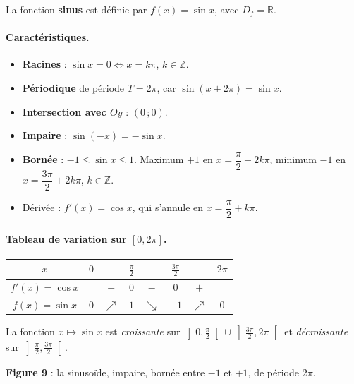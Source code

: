 \documentclass[11pt,a4paper]{article}
\newcommand{\R}{\mathbb{R}}
\newcommand{\Z}{\mathbb{Z}}
\newcommand{\Df}{D_f}
\newcommand{\croit}{\textcolor{varcol}{\Large$\nearrow$}}
\newcommand{\decroit}{\textcolor{varcol}{\Large$\searrow$}}
\begin{document}
\begin{definition}
La fonction \textbf{sinus} est définie par $f(x)=\sin x$, avec $\Df=\R$.
\end{definition}

\paragraph{Caractéristiques.}
\begin{itemize}[leftmargin=1.5em,topsep=2pt,itemsep=2pt]
  \item \textbf{Racines} : $\sin x=0 \Leftrightarrow x=k\pi$, $k\in\Z$.
  \item \textbf{Périodique} de période $T=2\pi$, car $\sin(x+2\pi)=\sin x$.
  \item \textbf{Intersection avec $Oy$} : $(0\,;0)$.
  \item \textbf{Impaire} : $\sin(-x)=-\sin x$.
  \item \textbf{Bornée} : $-1\leq \sin x\leq 1$. Maximum $+1$ en $x=\dfrac{\pi}{2}+2k\pi$,
        minimum $-1$ en $x=\dfrac{3\pi}{2}+2k\pi$, $k\in\Z$.
  \item Dérivée : $f'(x)=\cos x$, qui s'annule en $x=\dfrac{\pi}{2}+k\pi$.
\end{itemize}

\paragraph{Tableau de variation sur $[0,2\pi]$.}
\begin{center}
\renewcommand{\arraystretch}{1.6}\setlength{\tabcolsep}{9pt}
\begin{tabular}{|c|ccccccc|}
\hline
\rowcolor{primarylight}
$x$ & $0$ & & $\tfrac{\pi}{2}$ & & $\tfrac{3\pi}{2}$ & & $2\pi$ \\
\hline
$f'(x)=\cos x$ & & $+$ & $0$ & $-$ & $0$ & $+$ & \\
\hline
$f(x)=\sin x$ & $0$ & \croit & $1$ & \decroit & $-1$ & \croit & $0$ \\
\hline
\end{tabular}
\end{center}
La fonction $x\mapsto\sin x$ est \emph{croissante} sur
$\left]0,\tfrac{\pi}{2}\right[\cup\left]\tfrac{3\pi}{2},2\pi\right[$ et \emph{décroissante}
sur $\left]\tfrac{\pi}{2},\tfrac{3\pi}{2}\right[$.

\begin{center}
\textbf{\textcolor{primary}{Figure 9}} : la sinusoïde, impaire, bornée entre $-1$ et $+1$, de période $2\pi$.
\end{center}
\end{document}
